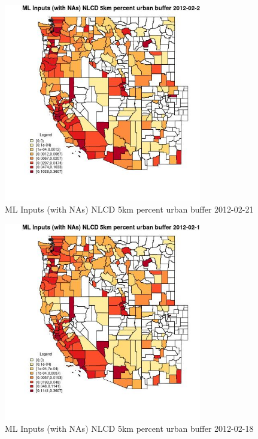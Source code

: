 \begin{figure} 
\centering  
\includegraphics[width=0.77\textwidth]{Code_Outputs/Report_ML_input_PM25_Step4_part_f_de_duplicated_aveswNAs_CountyNLCD_5km_percent_urban_bufferMean2012-02-21.jpg} 
\caption{\label{fig:Report_ML_input_PM25_Step4_part_f_de_duplicated_aveswNAsCountyNLCD_5km_percent_urban_bufferMean2012-02-21}ML Inputs (with NAs) NLCD 5km percent urban buffer 2012-02-21} 
\end{figure} 
 

\begin{figure} 
\centering  
\includegraphics[width=0.77\textwidth]{Code_Outputs/Report_ML_input_PM25_Step4_part_f_de_duplicated_aveswNAs_CountyNLCD_5km_percent_urban_bufferMean2012-02-18.jpg} 
\caption{\label{fig:Report_ML_input_PM25_Step4_part_f_de_duplicated_aveswNAsCountyNLCD_5km_percent_urban_bufferMean2012-02-18}ML Inputs (with NAs) NLCD 5km percent urban buffer 2012-02-18} 
\end{figure} 
 

